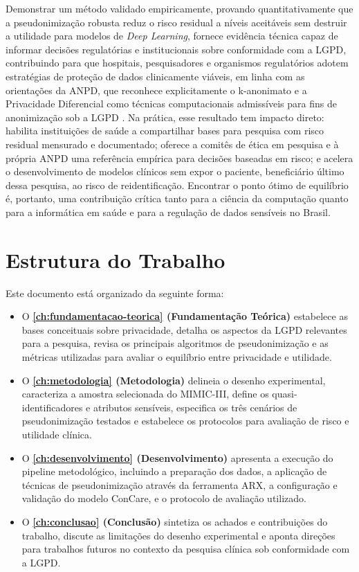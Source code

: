 Demonstrar um método validado empiricamente, provando quantitativamente que a pseudonimização robusta reduz o risco residual a níveis aceitáveis sem destruir a utilidade para modelos de \textit{Deep Learning}, fornece evidência técnica capaz de informar decisões regulatórias e institucionais sobre conformidade com a LGPD, contribuindo para que hospitais, pesquisadores e organismos regulatórios adotem estratégias de proteção de dados clinicamente viáveis, em linha com as orientações da ANPD, que reconhece explicitamente o k-anonimato e a Privacidade Diferencial como técnicas computacionais admissíveis para fins de anonimização sob a LGPD \cite{ANPD2023computacional, ANPD2023juridica}. Na prática, esse resultado tem impacto direto: habilita instituições de saúde a compartilhar bases para pesquisa com risco residual mensurado e documentado; oferece a comitês de ética em pesquisa e à própria ANPD uma referência empírica para decisões baseadas em risco; e acelera o desenvolvimento de modelos clínicos sem expor o paciente, beneficiário último dessa pesquisa, ao risco de reidentificação. Encontrar o ponto ótimo de equilíbrio é, portanto, uma contribuição crítica tanto para a ciência da computação quanto para a informática em saúde e para a regulação de dados sensíveis no Brasil.

\section{Estrutura do Trabalho}
\label{sec:intro-estrutura}

Este documento está organizado da seguinte forma:
\begin{itemize}
    \item O \textbf{\autoref{ch:fundamentacao-teorica} (Fundamentação Teórica)} estabelece as bases conceituais sobre privacidade, detalha os aspectos da LGPD relevantes para a pesquisa, revisa os principais algoritmos de pseudonimização e as métricas utilizadas para avaliar o equilíbrio entre privacidade e utilidade.
    \item O \textbf{\autoref{ch:metodologia} (Metodologia)} delineia o desenho experimental, caracteriza a amostra selecionada do MIMIC-III, define os quasi-identificadores e atributos sensíveis, especifica os três cenários de pseudonimização testados e estabelece os protocolos para avaliação de risco e utilidade clínica.
    \item O \textbf{\autoref{ch:desenvolvimento} (Desenvolvimento)} apresenta a execução do pipeline metodológico, incluindo a preparação dos dados, a aplicação de técnicas de pseudonimização através da ferramenta ARX, a configuração e validação do modelo ConCare, e o protocolo de avaliação utilizado.
    \item O \textbf{\autoref{ch:conclusao} (Conclusão)} sintetiza os achados e contribuições do trabalho, discute as limitações do desenho experimental e aponta direções para trabalhos futuros no contexto da pesquisa clínica sob conformidade com a LGPD.
\end{itemize}